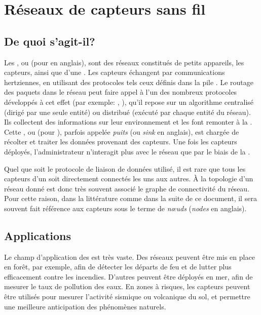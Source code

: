 \section{Réseaux de capteurs sans fil}
\label{st:sec:contexte}

    \subsection{De quoi s'agit-il?}
    Les \rcsfs, ou \textit{\WSN} (pour \wsns en anglais), sont des réseaux constitués de petits appareils, les capteurs, ainsi que d'une \sdb.
Les capteurs échangent par communications hertziennes, en utilisant des protocoles tels ceux définis dans la pile \ieeee.
Le routage des paquets dans le réseau peut faire appel à l'un des nombreux protocoles développés à cet effet (par exemple: \aodv, \olsr), qu'il repose sur un algorithme centralisé (dirigé par une seule entité) ou distribué (exécuté par chaque entité du réseau).
Ils collectent des informations sur leur environnement et les font remonter à la \sdb.
Cette \sdb, ou \BS (pour \bs), parfois appelée \textit{puits} (ou \textit{sink} en anglais), est chargée de récolter et traiter les données provenant des capteurs.
Une fois les capteurs déployés, l'administrateur n'interagit plus avec le réseau que par le biais de la \sdb.

Quel que soit le protocole de liaison de données utilisé, il est rare que tous les capteurs d'un \WSN soit directement connectés les uns aux autres.
À la topologie d'un réseau donné est donc très souvent associé le graphe de connectivité du réseau.
Pour cette raison, dans la littérature comme dans la suite de ce document, il sera souvent fait référence aux capteurs sous le terme de \textit{nœuds} (\textit{nodes} en anglais).

    \subsection{Applications}
Le champ d'application des \WSN est très vaste.
Des réseaux peuvent être mis en place en forêt, par exemple, afin de détecter les départs de feu et de lutter plus efficacement contre les incendies.
D'autres peuvent être déployés en mer, afin de mesurer le taux de pollution des eaux.
En zones à risques, les capteurs peuvent être utilisés pour mesurer l'activité sismique ou volcanique du sol, et permettre une meilleure anticipation des phénomènes naturels.


